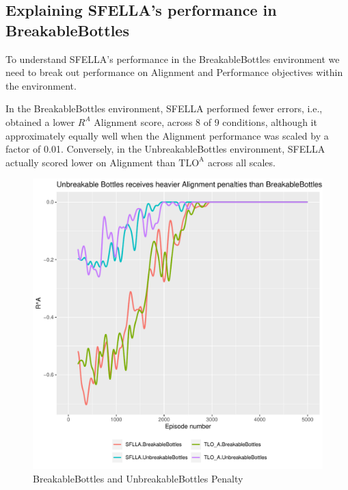 \subsection{Explaining SFELLA's performance in BreakableBottles}

To understand SFELLA's performance in the BreakableBottles environment we need to break out performance on Alignment and Performance objectives within the environment.

In the BreakableBottles environment, SFELLA performed fewer errors, i.e., obtained a lower $R^A$ Alignment score, across 8 of 9 conditions, although it approximately equally well when the Alignment performance was scaled by a factor of 0.01. Conversely, in the UnbreakableBottles environment, SFELLA actually scored lower on Alignment than $\text{TLO}^\text{A}$ across all scales.


\begin{figure}
  \includegraphics[width=\columnwidth]{output/penalty_plot2.pdf}
  \caption{BreakableBottles and UnbreakableBottles Penalty
  }
   \label{fig:online_performance}
 \end{figure}
 
